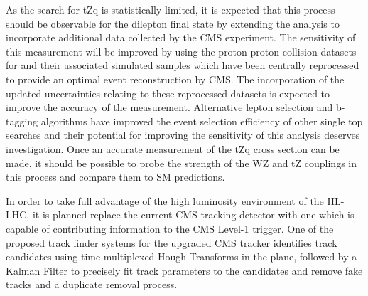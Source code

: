 As the search for tZq is statistically limited, it is expected that this process should be observable for the dilepton final state by extending the analysis to incorporate additional data collected by the CMS experiment.
The sensitivity of this measurement will be improved by using the proton-proton collision datasets for and their associated simulated samples which have been centrally reprocessed to provide an optimal event reconstruction by CMS.
The incorporation of the updated uncertainties relating to these reprocessed datasets is  expected to improve the accuracy of the measurement.
Alternative lepton selection and b-tagging algorithms have improved the event selection efficiency of other single top searches and their potential for improving the sensitivity of this analysis deserves investigation.
Once an accurate measurement of the tZq cross section can be made, it should be possible to probe  the strength of the WZ and tZ couplings in this process and compare them to SM predictions.

%

In order to take full advantage of the high luminosity environment of the HL-LHC, it is planned replace the current CMS tracking detector with one which is capable of contributing information to the CMS Level-1 trigger.
One of the proposed track finder systems for the upgraded CMS tracker identifies track candidates using time-multiplexed Hough Transforms in the \rphi plane, followed by a Kalman Filter to precisely fit track parameters to the candidates and remove fake tracks and a duplicate removal process.

